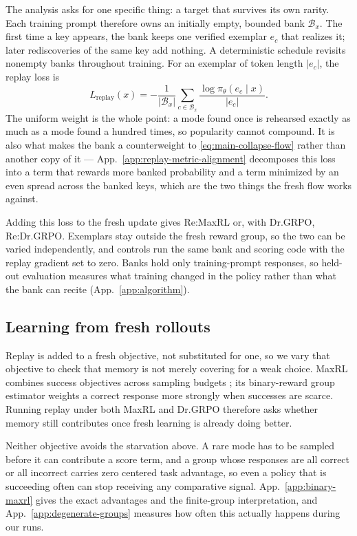 \documentclass{article}
\newcommand{\1}{\mathbf 1}
\theoremstyle{remark}
\theoremstyle{definition}
\theoremstyle{plain}
\begin{document}
The analysis asks for one specific thing: a target that survives its own rarity.
Each training prompt therefore owns an initially empty, bounded bank
$\mathcal B_x$. The first time a key appears, the bank keeps one verified
exemplar $e_c$ that realizes it; later rediscoveries of the same key add
nothing. A deterministic schedule revisits nonempty banks throughout training.
For an exemplar of token length $|e_c|$, the replay loss is
\begin{equation}
 L_{\mathrm{replay}}(x)=-\frac{1}{|\mathcal B_x|}
 \sum_{c\in\mathcal B_x}\frac{\log\pi_\theta(e_c\mid x)}{|e_c|}.
 \label{eq:lm-verified-replay}
\end{equation}
The uniform weight is the whole point: a mode found once is rehearsed exactly as
much as a mode found a hundred times, so popularity cannot compound. It is also
what makes the bank a counterweight to \eqref{eq:main-collapse-flow} rather than
another copy of it --- App.~\ref{app:replay-metric-alignment} decomposes this
loss into a term that rewards more banked probability and a term minimized by an
even spread across the banked keys, which are the two things the fresh flow
works against.

Adding this loss to the fresh update gives Re:MaxRL or, with Dr.GRPO,
Re:Dr.GRPO. Exemplars stay outside the fresh reward group, so the two can be
varied independently, and controls run the same bank and scoring code with the
replay gradient set to zero. Banks hold only training-prompt responses, so
held-out evaluation measures what training changed in the policy rather than
what the bank can recite (App.~\ref{app:algorithm}).

\subsection{Learning from fresh rollouts}
\label{sec:maxrl-method}

Replay is added to a fresh objective, not substituted for one, so we vary that
objective to check that memory is not merely covering for a weak choice. MaxRL
combines success objectives across sampling budgets \citep{tajwar2026maxrl}; its
binary-reward group estimator weights a correct response more strongly when
successes are scarce. Running replay under both MaxRL and Dr.GRPO
\citep{liu2025understanding} therefore asks whether memory still contributes
once fresh learning is already doing better.

Neither objective avoids the starvation above. A rare mode has to be sampled
before it can contribute a score term, and a group whose responses are all
correct or all incorrect carries zero centered task advantage, so even a policy
that is succeeding often can stop receiving any comparative signal.
App.~\ref{app:binary-maxrl} gives the exact advantages and the finite-group
interpretation, and App.~\ref{app:degenerate-groups} measures how often this
actually happens during our runs.
\end{document}
